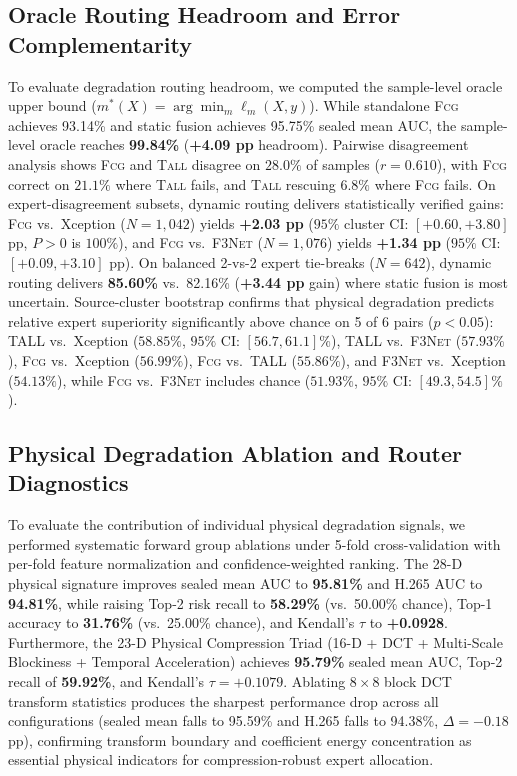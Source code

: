 \documentclass[conference]{IEEEtran}
\newcommand{\tall}{\textsc{Tall}}
\newcommand{\fcg}{\textsc{Fcg}}
\newcommand{\fthreenet}{\textsc{F3Net}}
\newcommand{\auc}{AUC}
\newcommand{\pp}{pp}
\begin{document}
\subsection{Oracle Routing Headroom and Error Complementarity}
To evaluate degradation routing headroom, we computed the sample-level oracle upper bound ($m^*(X) = \arg\min_m \ell_m(X, y)$). While standalone \fcg{} achieves 93.14\% and static fusion achieves 95.75\% sealed mean \auc{}, the sample-level oracle reaches \textbf{99.84\%} (\textbf{+4.09 \pp{}} headroom). Pairwise disagreement analysis shows \fcg{} and \tall{} disagree on $28.0\%$ of samples ($r=0.610$), with \fcg{} correct on $21.1\%$ where \tall{} fails, and \tall{} rescuing $6.8\%$ where \fcg{} fails. On expert-disagreement subsets, dynamic routing delivers statistically verified gains: \fcg{} vs.\ Xception ($N=1,042$) yields \textbf{+2.03 \pp{}} ($95\%$ cluster CI: $[+0.60, +3.80]$ \pp{}, $P > 0$ is $100\%$), and \fcg{} vs.\ \fthreenet{} ($N=1,076$) yields \textbf{+1.34 \pp{}} ($95\%$ CI: $[+0.09, +3.10]$ \pp{}). On balanced 2-vs-2 expert tie-breaks ($N=642$), dynamic routing delivers \textbf{85.60\%} vs.\ 82.16\% (\textbf{+3.44 \pp{}} gain) where static fusion is most uncertain. Source-cluster bootstrap confirms that physical degradation predicts relative expert superiority significantly above chance on 5 of 6 pairs ($p < 0.05$): TALL vs.\ Xception ($58.85\%$, $95\%$ CI: $[56.7, 61.1]\%$), TALL vs.\ \fthreenet{} ($57.93\%$), \fcg{} vs.\ Xception ($56.99\%$), \fcg{} vs.\ TALL ($55.86\%$), and \fthreenet{} vs.\ Xception ($54.13\%$), while \fcg{} vs.\ \fthreenet{} includes chance ($51.93\%$, $95\%$ CI: $[49.3, 54.5]\%$).

\subsection{Physical Degradation Ablation and Router Diagnostics}
To evaluate the contribution of individual physical degradation signals, we performed systematic forward group ablations under 5-fold cross-validation with per-fold feature normalization and confidence-weighted ranking. The 28-D physical signature improves sealed mean \auc{} to \textbf{95.81\%} and H.265 \auc{} to \textbf{94.81\%}, while raising Top-2 risk recall to \textbf{58.29\%} (vs.\ 50.00\% chance), Top-1 accuracy to \textbf{31.76\%} (vs.\ 25.00\% chance), and Kendall's $\tau$ to \textbf{+0.0928}. Furthermore, the 23-D Physical Compression Triad (16-D + DCT + Multi-Scale Blockiness + Temporal Acceleration) achieves \textbf{95.79\%} sealed mean \auc{}, Top-2 recall of \textbf{59.92\%}, and Kendall's $\tau = \mathbf{+0.1079}$. Ablating $8\times8$ block DCT transform statistics produces the sharpest performance drop across all configurations (sealed mean falls to 95.59\% and H.265 falls to 94.38\%, $\Delta = -0.18$ \pp{}), confirming transform boundary and coefficient energy concentration as essential physical indicators for compression-robust expert allocation.
\end{document}
